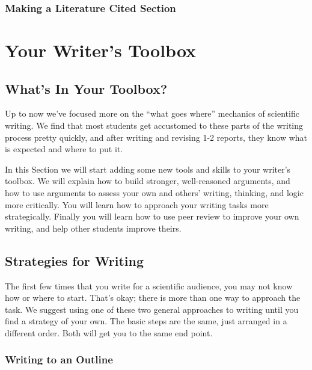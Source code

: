 \documentclass[
]{book}
\begin{document}
\hypertarget{making-a-literature-cited-section}{%
\section*{Making a Literature Cited Section}\label{making-a-literature-cited-section}}

\hypertarget{part-your-writers-toolbox}{%
\part{Your Writer's Toolbox}\label{part-your-writers-toolbox}}

\hypertarget{toolbox600}{%
\chapter{What's In Your Toolbox?}\label{toolbox600}}

Up to now we've focused more on the ``what goes where'' mechanics of scientific writing. We find that most students get accustomed to these parts of the writing process pretty quickly, and after writing and revising 1-2 reports, they know what is expected and where to put it.

In this Section we will start adding some new tools and skills to your writer's toolbox. We will explain how to build stronger, well-reasoned arguments, and how to use arguments to assess your own and others' writing, thinking, and logic more critically. You will learn how to approach your writing tasks more strategically. Finally you will learn how to use peer review to improve your own writing, and help other students improve theirs.

\hypertarget{strategies610}{%
\chapter{Strategies for Writing}\label{strategies610}}

The first few times that you write for a scientific audience, you may not know how or where to start. That's okay; there is more than one way to approach the task. We suggest using one of these two general approaches to writing until you find a strategy of your own. The basic steps are the same, just arranged in a different order. Both will get you to the same end point.

\hypertarget{writing-to-an-outline}{%
\section{Writing to an Outline}\label{writing-to-an-outline}}
\end{document}
